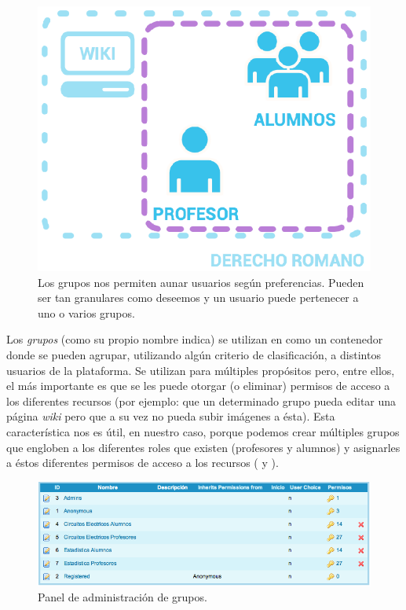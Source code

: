 \begin{figure}
\centering
\includegraphics[width=.8\linewidth]{../graphics/fig_comunidad_de_practica_derecho_romano_grupos.eps}
\caption{Los grupos nos permiten aunar usuarios según preferencias. Pueden ser tan granulares como deseemos y un usuario puede pertenecer a uno o varios grupos.}\label{fig:comunidad_de_practica_derecho_romano_grupos}
\end{figure}

Los \textit{grupos} (como su propio nombre indica) se utilizan en \tiki{} como un contenedor donde se pueden agrupar, utilizando algún criterio de clasificación, a distintos usuarios de la plataforma. Se utilizan para múltiples propósitos pero, entre ellos, el más importante es que se les puede otorgar (o eliminar) permisos de acceso a los diferentes recursos (por ejemplo: que un determinado grupo pueda editar una página \textit{wiki} pero que a su vez no pueda subir imágenes a ésta). Esta característica nos es útil, en nuestro caso, porque podemos crear múltiples grupos que engloben a los diferentes roles que existen (profesores y alumnos) y asignarles a éstos diferentes permisos de acceso a los recursos ( y ).

\begin{figure}
\centering
\includegraphics[width=\linewidth]{../graphics/fig_panel_administracion_grupos.png}
\caption{Panel de administración de grupos.}\label{fig:panel_administracion_grupos}
\end{figure}

